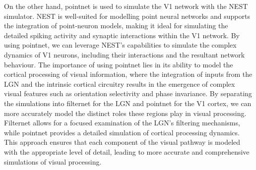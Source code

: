\documentclass[12pt]{article}
\begin{document}
On the other hand, pointnet is used to simulate the V1 network with the NEST simulator. NEST is well-suited for modelling point neural networks and supports the integration of point-neuron models, making it ideal for simulating the detailed spiking activity and synaptic interactions within the V1 network. By using pointnet, we can leverage NEST's capabilities to simulate the complex dynamics of V1 neurons, including their interactions and the resultant network behaviour. The importance of using pointnet lies in its ability to model the cortical processing of visual information, where the integration of inputs from the LGN and the intrinsic cortical circuitry results in the emergence of complex visual features such as orientation selectivity and phase invariance. By separating the simulations into filternet for the LGN and pointnet for the V1 cortex, we can more accurately model the distinct roles these regions play in visual processing. Filternet allows for a focused examination of the LGN's filtering mechanisms, while pointnet provides a detailed simulation of cortical processing dynamics. This approach ensures that each component of the visual pathway is modeled with the appropriate level of detail, leading to more accurate and comprehensive simulations of visual processing.
\end{document}
